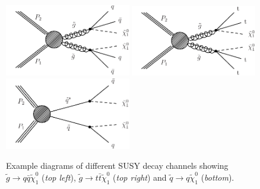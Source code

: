\begin{figure}[!t]
  \centering
  \begin{minipage}[c]{1.\textwidth}
    \begin{center}
      \includegraphics[width=0.49\textwidth]{figures/T1qqqq.pdf}  
      \includegraphics[width=0.49\textwidth]{figures/T1tttt_feyn.pdf} \\
      \includegraphics[width=0.49\textwidth]{figures/T2qq.pdf}
    \end{center}
  \end{minipage}
  \caption{Example diagrams of different SUSY decay channels showing $\tilde{g} \rightarrow q\bar{q} \tilde{\chi}_1^0$ (\textit{top left}), $\tilde{g} \rightarrow t\bar{t}\tilde{\chi}_1^0$ (\textit{top right}) and $\tilde{q} \rightarrow q\tilde{\chi}_1^0$ (\textit{bottom}).}
  \label{fig:susy_decay}
\end{figure}
\\
